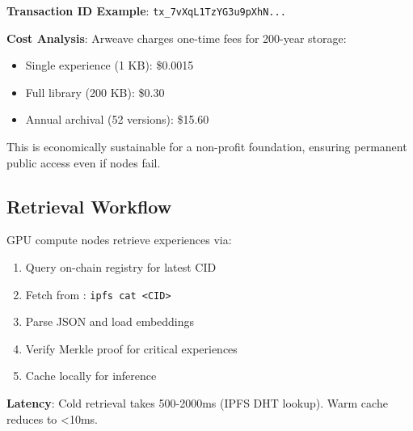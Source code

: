 \textbf{Transaction ID Example}: \texttt{tx\_7vXqL1TzYG3u9pXhN...}

\textbf{Cost Analysis}: Arweave charges one-time fees for 200-year storage:
\begin{itemize}
    \item Single experience (1 KB): \$0.0015
    \item Full library (200 KB): \$0.30
    \item Annual archival (52 versions): \$15.60
\end{itemize}

This is economically sustainable for a non-profit foundation, ensuring permanent public access even if \IPFS{} nodes fail.

\subsection{Retrieval Workflow}

GPU compute nodes retrieve experiences via:

\begin{enumerate}
    \item Query on-chain registry for latest CID
    \item Fetch from \IPFS{}: \texttt{ipfs cat <CID>}
    \item Parse JSON and load embeddings
    \item Verify Merkle proof for critical experiences
    \item Cache locally for inference
\end{enumerate}

\textbf{Latency}: Cold retrieval takes 500-2000ms (IPFS DHT lookup). Warm cache reduces to <10ms.

